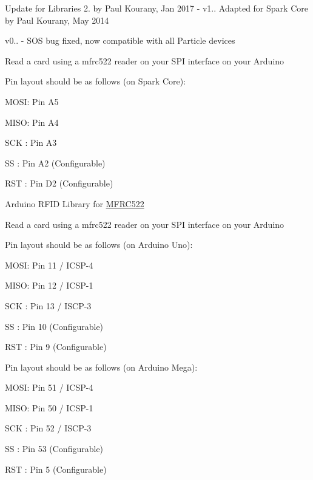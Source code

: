 Update for Libraries 2. by Paul Kourany, Jan 2017 -\/ v1.. Adapted for Spark Core by Paul Kourany, May 2014

v0.. -\/ S\+OS bug fixed, now compatible with all Particle devices

Read a card using a mfrc522 reader on your S\+PI interface on your Arduino
\begin{DoxyItemize}
\item Pin layout should be as follows (on Spark Core)\+:
\item M\+O\+SI\+: Pin A5
\item M\+I\+SO\+: Pin A4
\item S\+CK \+: Pin A3
\item SS \+: Pin A2 (Configurable)
\item R\+ST \+: Pin D2 (Configurable)
\item 
\end{DoxyItemize}

Arduino R\+F\+ID Library for \hyperlink{class_m_f_r_c522}{M\+F\+R\+C522}

Read a card using a mfrc522 reader on your S\+PI interface on your Arduino
\begin{DoxyItemize}
\item Pin layout should be as follows (on Arduino Uno)\+:
\item M\+O\+SI\+: Pin 11 / I\+C\+S\+P-\/4
\item M\+I\+SO\+: Pin 12 / I\+C\+S\+P-\/1
\item S\+CK \+: Pin 13 / I\+S\+C\+P-\/3
\item SS \+: Pin 10 (Configurable)
\item R\+ST \+: Pin 9 (Configurable)
\item 
\item Pin layout should be as follows (on Arduino Mega)\+:
\item M\+O\+SI\+: Pin 51 / I\+C\+S\+P-\/4
\item M\+I\+SO\+: Pin 50 / I\+C\+S\+P-\/1
\item S\+CK \+: Pin 52 / I\+S\+C\+P-\/3
\item SS \+: Pin 53 (Configurable)
\item R\+ST \+: Pin 5 (Configurable) 
\end{DoxyItemize}